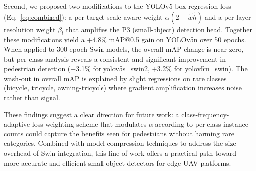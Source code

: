 \documentclass[conference]{IEEEtran}
\begin{document}
Second, we proposed two modifications to the YOLOv5 box regression loss
(Eq.~\ref{eq:combined}): a per-target scale-aware weight
$\alpha(2-\tilde{w}\tilde{h})$ and a per-layer resolution weight $\beta_l$
that amplifies the P3 (small-object) detection head.  Together these
modifications yield a +4.8\% mAP@0.5 gain on YOLOv5n over 50 epochs.
When applied to 300-epoch Swin models, the overall mAP change is near
zero, but per-class analysis reveals a consistent and significant improvement
in pedestrian detection (+3.1\% for yolov5s\_swin2, +3.2\% for
yolov5m\_swin).  The wash-out in overall mAP is explained by slight
regressions on rare classes (bicycle, tricycle, awning-tricycle) where
gradient amplification increases noise rather than signal.

These findings suggest a clear direction for future work: a
class-frequency-adaptive loss weighting scheme that modulates $\alpha$
according to per-class instance counts could capture the benefits seen for
pedestrians without harming rare categories.  Combined with model compression
techniques to address the size overhead of Swin integration, this line of
work offers a practical path toward more accurate and efficient small-object
detectors for edge UAV platforms.
\end{document}
